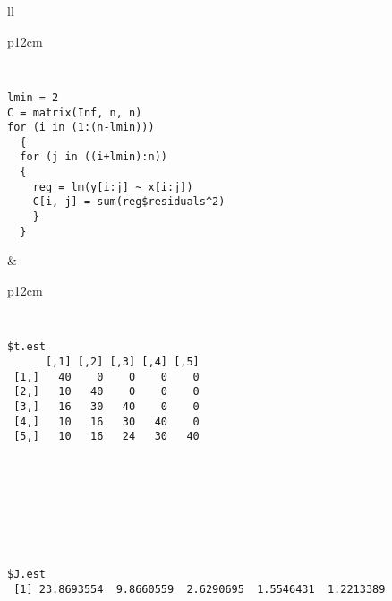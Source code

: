\documentclass[dvips, lscape]{foils}
\newcommand{\textblue}[1]{\textcolor{blue}{#1}}
\newcommand{\subsection}[1]{
  \addtocounter{subsection}{1}
  {\noindent{\large \textblue{#1}}}
  }
\newcommand{\paragraph}[1]{\noindent{\textblue{#1}}}
\begin{document}
\noindent
\begin{tabular}{ll}
  \begin{tabular}{p{12cm}}
    \paragraph{Cost matrix:}
    {\tt %
\begin{verbatim}
lmin = 2
C = matrix(Inf, n, n)
for (i in (1:(n-lmin))) 
  {
  for (j in ((i+lmin):n)) 
  {
    reg = lm(y[i:j] ~ x[i:j])
    C[i, j] = sum(reg$residuals^2)
    } 
  }
\end{verbatim}
      }
  \end{tabular}
  &
  \begin{tabular}{p{12cm}}
    \paragraph{Breakpoints:}
    {\tt %
\begin{verbatim}
$t.est
      [,1] [,2] [,3] [,4] [,5] 
 [1,]   40    0    0    0    0 
 [2,]   10   40    0    0    0 
 [3,]   16   30   40    0    0 
 [4,]   10   16   30   40    0 
 [5,]   10   16   24   30   40 
\end{verbatim}
      }
  \\ \\ \\ \\
  \end{tabular} 
\end{tabular}

\paragraph{Contrasts:} 
{\tt %
\begin{verbatim}
$J.est
 [1] 23.8693554  9.8660559  2.6290695  1.5546431  1.2213389  
\end{verbatim}
}

\newpage
\subsection{One last problem: the selection of $K$}
\end{document}

